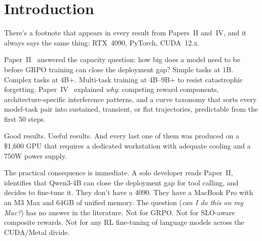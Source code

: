 \documentclass[11pt]{article}
\begin{document}
\begin{abstract}
What we found: TBD.  The capacity threshold on MLX TBD relative to CUDA: models that sustain learning on CUDA TBD sustain on MLX.  The training dynamics (forgetting patterns, curve taxonomy, early prediction features) are TBD hardware-dependent, which suggests these phenomena are TBD model-intrinsic rather than artifacts of the training infrastructure.  Wall-clock costs on MLX run TBD$\times$ higher than CUDA, but energy efficiency (accuracy gain per watt-hour) is TBD because Apple Silicon draws 4.9$\times$ less power.  The practical implication: GRPO training for SLO compliance TBD on hardware that costs under \$4{,}000 and sits on a desk.
\end{abstract}

\section{Introduction}

There's a footnote that appears in every result from Papers~II and~IV, and it always says the same thing: RTX~4090, PyTorch, CUDA~12.x.

Paper~II~\citep{maloney2025capacity} answered the capacity question: how big does a model need to be before GRPO training can close the deployment gap?  Simple tasks at 1B.  Complex tasks at 4B+.  Multi-task training at 4B--9B+ to resist catastrophic forgetting.  Paper~IV~\citep{maloney2025dynamics} explained \emph{why}: competing reward components, architecture-specific interference patterns, and a curve taxonomy that sorts every model-task pair into sustained, transient, or flat trajectories, predictable from the first 50 steps.

Good results.  Useful results.  And every last one of them was produced on a \$1{,}600 GPU that requires a dedicated workstation with adequate cooling and a 750W power supply.

The practical consequence is immediate.  A solo developer reads Paper~II, identifies that Qwen3-4B can close the deployment gap for tool calling, and decides to fine-tune it.  They don't have a 4090.  They have a MacBook Pro with an M3 Max and 64GB of unified memory.  The question (\emph{can I do this on my Mac?}) has no answer in the literature.  Not for GRPO.  Not for SLO-aware composite rewards.  Not for any RL fine-tuning of language models across the CUDA/Metal divide.
\end{document}
